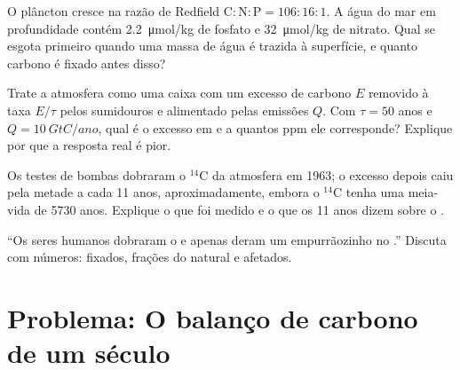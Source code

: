 \begin{exercise}[$\star\star$]\label{exo:b2:biogeochemical-cycles:9}
O plâncton cresce na razão de Redfield $\mathrm{C:N:P} = 106:16:1$.
A água do mar em profundidade contém \qty{2.2}{\micro mol/kg} de fosfato
e \qty{32}{\micro mol/kg} de nitrato. Qual se esgota primeiro quando uma
massa de água é trazida à superfície, e quanto carbono é fixado antes
disso?
\end{exercise}

\begin{exercise}[$\star\star\star$]\label{exo:b2:biogeochemical-cycles:10}
Trate a atmosfera como uma caixa com um excesso de carbono $E$ removido
à taxa $E/\tau$ pelos sumidouros e alimentado pelas emissões $Q$. Com $\tau =
50$ anos e $Q = \qty{10}{GtC/ano}$, qual é o excesso em  e a quantos ppm ele corresponde? Explique por que a
resposta real é pior.
\end{exercise}

\begin{exercise}[$\star\star\star$]\label{exo:b2:biogeochemical-cycles:11}
Os testes de bombas dobraram o $\mathrm{{}^{14}C}$ da atmosfera em 1963; o
excesso depois caiu pela metade a cada 11 anos, aproximadamente, embora o $\mathrm{{}^{14}C}$
tenha uma meia-vida de 5730 anos. Explique o que foi medido e o que
os 11 anos dizem sobre o .
\end{exercise}

\begin{exercise}[$\star\star\star$]\label{exo:b2:biogeochemical-cycles:12}
``Os seres humanos dobraram o  e apenas deram um
empurrãozinho no .'' Discuta com números: 
fixados, frações do  natural e  afetados.
\end{exercise}

\section{Problema: O balanço de carbono de um século}

